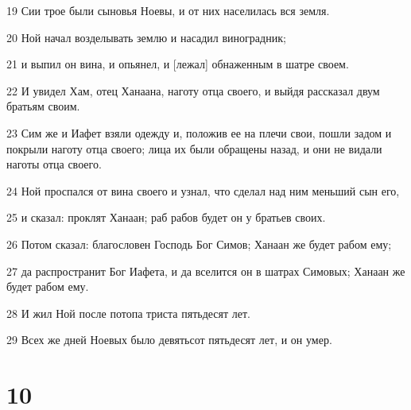 \par 19 Сии трое были сыновья Ноевы, и от них населилась вся земля.
\par 20 Ной начал возделывать землю и насадил виноградник;
\par 21 и выпил он вина, и опьянел, и [лежал] обнаженным в шатре своем.
\par 22 И увидел Хам, отец Ханаана, наготу отца своего, и выйдя рассказал двум братьям своим.
\par 23 Сим же и Иафет взяли одежду и, положив ее на плечи свои, пошли задом и покрыли наготу отца своего; лица их были обращены назад, и они не видали наготы отца своего.
\par 24 Ной проспался от вина своего и узнал, что сделал над ним меньший сын его,
\par 25 и сказал: проклят Ханаан; раб рабов будет он у братьев своих.
\par 26 Потом сказал: благословен Господь Бог Симов; Ханаан же будет рабом ему;
\par 27 да распространит Бог Иафета, и да вселится он в шатрах Симовых; Ханаан же будет рабом ему.
\par 28 И жил Ной после потопа триста пятьдесят лет.
\par 29 Всех же дней Ноевых было девятьсот пятьдесят лет, и он умер.

\chapter{10}

